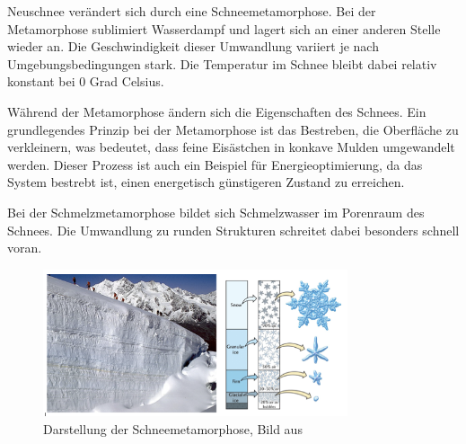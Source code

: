 Neuschnee verändert sich durch eine Schneemetamorphose. Bei der Metamorphose sublimiert Wasserdampf und lagert sich an einer anderen Stelle wieder an. Die Geschwindigkeit dieser Umwandlung variiert je nach Umgebungsbedingungen stark. Die Temperatur im Schnee bleibt dabei relativ konstant bei 0 Grad Celsius.

Während der Metamorphose ändern sich die Eigenschaften des Schnees. Ein grundlegendes Prinzip bei der Metamorphose ist das Bestreben, die Oberfläche zu verkleinern, was bedeutet, dass feine Eisästchen in konkave Mulden umgewandelt werden. Dieser Prozess ist auch ein Beispiel für Energieoptimierung, da das System bestrebt ist, einen energetisch günstigeren Zustand zu erreichen.

Bei der Schmelzmetamorphose bildet sich Schmelzwasser im Porenraum des Schnees. Die Umwandlung zu runden Strukturen schreitet dabei besonders schnell voran. \cite{WSLSLFMetha.2024}

\begin{figure}[H]
    \centering
    \includegraphics[width=0.8\textwidth]{Bilder/gletscher_eis_schnee.png}
    \caption{Darstellung der Schneemetamorphose, Bild aus \cite{Wetterdienst.6222017}}
    \label{fig:Metha}
\end{figure}
